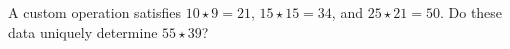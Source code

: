 A custom operation satisfies $10\star9=21$, $15\star15=34$, and $25\star21=50$. Do these data uniquely determine $55\star39$?
